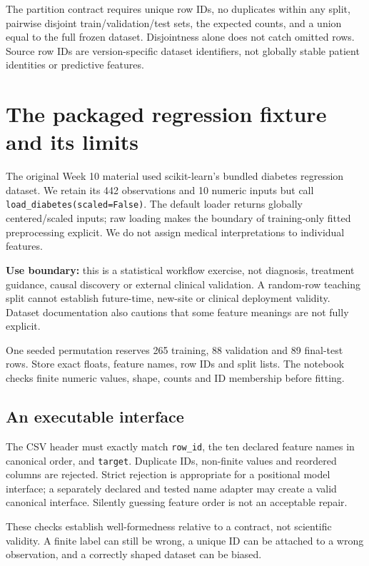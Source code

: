 The partition contract requires unique row IDs, no duplicates within any split, pairwise disjoint train/validation/test sets, the expected counts, and a union equal to the full frozen dataset. Disjointness alone does not catch omitted rows. Source row IDs are version-specific dataset identifiers, not globally stable patient identities or predictive features.

\section{The packaged regression fixture and its limits}
The original Week 10 material used scikit-learn's bundled diabetes regression dataset. We retain its 442 observations and 10 numeric inputs but call \texttt{load\_diabetes(scaled=False)}. The default loader returns globally centered/scaled inputs; raw loading makes the boundary of training-only fitted preprocessing explicit. We do not assign medical interpretations to individual features.

\textbf{Use boundary:} this is a statistical workflow exercise, not diagnosis, treatment guidance, causal discovery or external clinical validation. A random-row teaching split cannot establish future-time, new-site or clinical deployment validity. Dataset documentation also cautions that some feature meanings are not fully explicit.

One seeded permutation reserves 265 training, 88 validation and 89 final-test rows. Store exact floats, feature names, row IDs and split lists. The notebook checks finite numeric values, shape, counts and ID membership before fitting.

\subsection{An executable interface}
The CSV header must exactly match \texttt{row\_id}, the ten declared feature names in canonical order, and \texttt{target}. Duplicate IDs, non-finite values and reordered columns are rejected. Strict rejection is appropriate for a positional model interface; a separately declared and tested name adapter may create a valid canonical interface. Silently guessing feature order is not an acceptable repair.

These checks establish well-formedness relative to a contract, not scientific validity. A finite label can still be wrong, a unique ID can be attached to a wrong observation, and a correctly shaped dataset can be biased.

